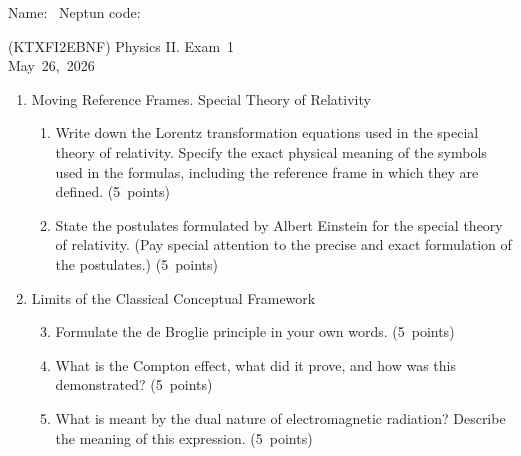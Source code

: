 \documentclass[a4paper,12pt]{letter}
\begin{document}
Name: \hrulefill\ Neptun code: \hrulefill

\bigskip

\begin{center}
(KTXFI2EBNF) Physics II. Exam~1 \\
May~26,~2026
\end{center}

\bigskip
 
\begin{enumerate}[label=\Roman*.]
   
\item Moving Reference Frames. Special Theory of Relativity

\begin{enumerate}[label=\arabic*.]
\setcounter{enumii}{0} %

\item  Write down the Lorentz transformation equations used in the special theory of relativity. Specify the exact physical meaning of the symbols used in the formulas, including the reference frame in which they are defined. \hfill (5~points)

\item State the postulates formulated by Albert Einstein for the special theory of relativity. (Pay special attention to the precise and exact formulation of the postulates.) \hfill (5~points)

\end{enumerate}


\item Limits of the Classical Conceptual Framework

\begin{enumerate}[label=\arabic*.]
\setcounter{enumii}{2} %

\item Formulate the de Broglie principle in your own words. \hfill (5~points)
  
\item What is the Compton effect, what did it prove, and how was this demonstrated? \hfill (5~points)

\item What is meant by the dual nature of electromagnetic radiation? Describe the meaning of this expression. \hfill (5~points)

\end{enumerate}
  

\end{enumerate}
\end{document}
